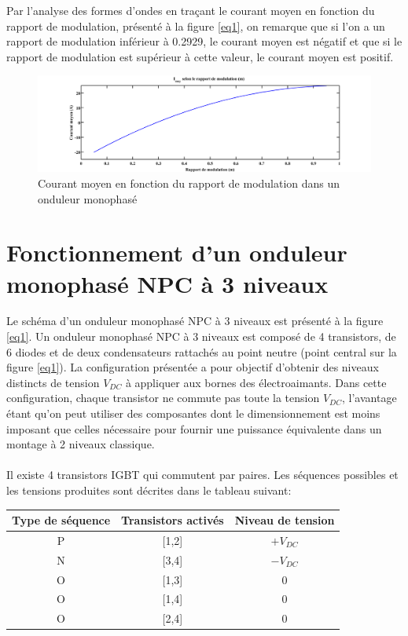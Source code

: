 \documentclass[11pt,letterpaper,final]{report}
\begin{document}
Par l'analyse des formes d'ondes en traçant le courant moyen en fonction du rapport de modulation, présenté à la figure \ref{eq1}, on remarque que si l'on a un rapport de modulation inférieur à 0.2929, le courant moyen est négatif et que si le rapport de modulation est supérieur à cette valeur, le courant moyen est positif.

\begin{figure}[htb]
\centering
\includegraphics[scale=0.4]{Imoy_m.png}
\caption{Courant moyen en fonction du rapport de modulation dans un onduleur monophasé}
\end{figure}

\section{Fonctionnement d'un onduleur monophasé NPC à 3 niveaux}
Le schéma d'un onduleur monophasé NPC à 3 niveaux est présenté à la figure \ref{eq1}. Un onduleur monophasé NPC à 3 niveaux est composé de 4 transistors, de 6 diodes et de deux condensateurs rattachés au point neutre (point central sur la figure \ref{eq1}). La configuration présentée a pour objectif d'obtenir des niveaux distincts de tension $V_{DC}$ à appliquer aux bornes des électroaimants. Dans cette configuration, chaque transistor ne commute pas toute la tension $V_{DC}$, l'avantage étant qu'on peut utiliser des composantes dont le dimensionnement est moins imposant que celles nécessaire pour fournir une puissance équivalente dans un montage à 2 niveaux classique. 

\paragraph{}Il existe 4 transistors IGBT qui commutent par paires. Les séquences possibles et les tensions produites sont décrites dans le tableau suivant:

\begin{table}[htb]
\centering
\begin{tabular}{ |c|c|c| }
\hline
  Type de séquence & Transistors activés & Niveau de tension \\\hline\hline
  P & [1,2] & $+V_{DC}$ \\\hline
  N & [3,4] & $-V_{DC}$ \\\hline
  O & [1,3] & $0$ \\\hline
  O & [1,4] & $0$ \\\hline
  O & [2,4] & $0$ \\\hline
\end{tabular}
\end{table}
\end{document}
